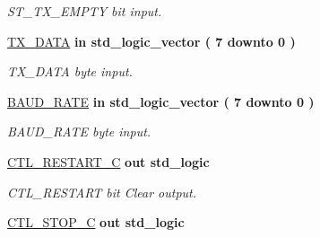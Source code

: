 \begin{DoxyCompactItemize}
\begin{DoxyCompactList}\small\item\em S\+T\+\_\+\+T\+X\+\_\+\+E\+M\+P\+TY bit input. \end{DoxyCompactList}\item 
\hyperlink{classi2c__master__engine_ac6b0a7edf9c2b243032204db9d65f177}{T\+X\+\_\+\+D\+A\+TA}  {\bfseries {\bfseries \textcolor{vhdlchar}{in}\textcolor{vhdlchar}{ }}} {\bfseries \textcolor{vhdlchar}{std\+\_\+logic\+\_\+vector}\textcolor{vhdlchar}{ }\textcolor{vhdlchar}{(}\textcolor{vhdlchar}{ }\textcolor{vhdlchar}{ } \textcolor{vhdldigit}{7} \textcolor{vhdlchar}{ }\textcolor{vhdlchar}{downto}\textcolor{vhdlchar}{ }\textcolor{vhdlchar}{ } \textcolor{vhdldigit}{0} \textcolor{vhdlchar}{ }\textcolor{vhdlchar}{)}\textcolor{vhdlchar}{ }} 
\begin{DoxyCompactList}\small\item\em T\+X\+\_\+\+D\+A\+TA byte input. \end{DoxyCompactList}\item 
\hyperlink{classi2c__master__engine_a82e79d6ce7e6595b82fd7bcfae4dce09}{B\+A\+U\+D\+\_\+\+R\+A\+TE}  {\bfseries {\bfseries \textcolor{vhdlchar}{in}\textcolor{vhdlchar}{ }}} {\bfseries \textcolor{vhdlchar}{std\+\_\+logic\+\_\+vector}\textcolor{vhdlchar}{ }\textcolor{vhdlchar}{(}\textcolor{vhdlchar}{ }\textcolor{vhdlchar}{ } \textcolor{vhdldigit}{7} \textcolor{vhdlchar}{ }\textcolor{vhdlchar}{downto}\textcolor{vhdlchar}{ }\textcolor{vhdlchar}{ } \textcolor{vhdldigit}{0} \textcolor{vhdlchar}{ }\textcolor{vhdlchar}{)}\textcolor{vhdlchar}{ }} 
\begin{DoxyCompactList}\small\item\em B\+A\+U\+D\+\_\+\+R\+A\+TE byte input. \end{DoxyCompactList}\item 
\hyperlink{classi2c__master__engine_a076711c9bf8c9e4ad38be7d4bde56ddf}{C\+T\+L\+\_\+\+R\+E\+S\+T\+A\+R\+T\+\_\+C}  {\bfseries {\bfseries \textcolor{vhdlchar}{out}\textcolor{vhdlchar}{ }}} {\bfseries \textcolor{vhdlchar}{std\+\_\+logic}\textcolor{vhdlchar}{ }} 
\begin{DoxyCompactList}\small\item\em C\+T\+L\+\_\+\+R\+E\+S\+T\+A\+RT bit Clear output. \end{DoxyCompactList}\item 
\hyperlink{classi2c__master__engine_a084ae287c960145f1995096b379711cd}{C\+T\+L\+\_\+\+S\+T\+O\+P\+\_\+C}  {\bfseries {\bfseries \textcolor{vhdlchar}{out}\textcolor{vhdlchar}{ }}} {\bfseries \textcolor{vhdlchar}{std\+\_\+logic}\textcolor{vhdlchar}{ }} 

\end{DoxyCompactItemize}

